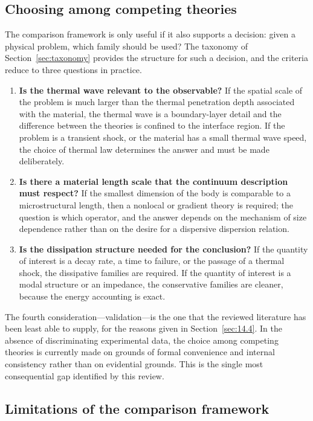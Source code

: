 \subsection{Choosing among competing theories}
\label{sec:12.6}

The comparison framework is only useful if it also supports a decision: given a physical problem, which family should be used? The taxonomy of Section~\ref{sec:taxonomy} provides the structure for such a decision, and the criteria reduce to three questions in practice.

\begin{enumerate}
\item \textbf{Is the thermal wave relevant to the observable?} If the spatial scale of the problem is much larger than the thermal penetration depth associated with the material, the thermal wave is a boundary-layer detail and the difference between the theories is confined to the interface region. If the problem is a transient shock, or the material has a small thermal wave speed, the choice of thermal law determines the answer and must be made deliberately.
\item \textbf{Is there a material length scale that the continuum description must respect?} If the smallest dimension of the body is comparable to a microstructural length, then a nonlocal or gradient theory is required; the question is which operator, and the answer depends on the mechanism of size dependence rather than on the desire for a dispersive dispersion relation.
\item \textbf{Is the dissipation structure needed for the conclusion?} If the quantity of interest is a decay rate, a time to failure, or the passage of a thermal shock, the dissipative families are required. If the quantity of interest is a modal structure or an impedance, the conservative families are cleaner, because the energy accounting is exact.
\end{enumerate}

The fourth consideration---validation---is the one that the reviewed literature has been least able to supply, for the reasons given in Section~\ref{sec:14.4}. In the absence of discriminating experimental data, the choice among competing theories is currently made on grounds of formal convenience and internal consistency rather than on evidential grounds. This is the single most consequential gap identified by this review.

\subsection{Limitations of the comparison framework}
\label{sec:12.7}

